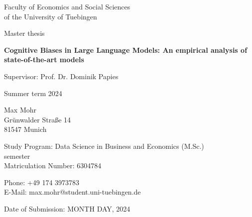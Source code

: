 \documentclass[12pt, a4paper, titlepage]{article}
\begin{document}
\begin{titlepage}
  \begin{center}
    Faculty of Economics and Social Sciences\\
    of the University of Tuebingen

    \vspace{3cm}

    Master thesis

    \vspace{1cm}

    {\Large\textbf{Cognitive Biases in Large Language Models: An empirical analysis of state-of-the-art models}}

    \vspace{0.5cm}

    Supervisor: Prof. Dr. Dominik Papies

    \vspace{0.5cm}

    Summer term 2024

  \end{center}

  \vfill

  \begin{multicols}{2}

    Max Mohr\\
    Grünwalder Straße 14\\
    81547 Munich

    \vfill

    Study Program: Data Science in Business and Economics (M.Sc.)\\
     semester\\
    Matriculation Number: 6304784
  \end{multicols}

  \begin{multicols}{2}
    Phone: +49 174 3973783\\
    E-Mail: max.mohr@student.uni-tuebingen.de\\

    \vfill

    Date of Submission: MONTH DAY, 2024

  \end{multicols}
\end{titlepage}


\newpage
{} %
\setcounter{page}{2}
\tableofcontents


\clearpage
{} %
\end{document}
